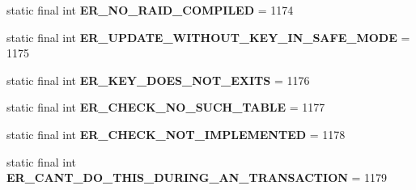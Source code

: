 \begin{DoxyCompactItemize}
\item 
\mbox{\label{classcom_1_1mysql_1_1cj_1_1exceptions_1_1_mysql_error_numbers_a4344df96096a5800d1eb6bc0d83f7972}} 
static final int {\bfseries E\+R\+\_\+\+N\+O\+\_\+\+R\+A\+I\+D\+\_\+\+C\+O\+M\+P\+I\+L\+ED} = 1174
\item 
\mbox{\label{classcom_1_1mysql_1_1cj_1_1exceptions_1_1_mysql_error_numbers_a95c6ce896a03308d2e90ca7d1ec9c8f3}} 
static final int {\bfseries E\+R\+\_\+\+U\+P\+D\+A\+T\+E\+\_\+\+W\+I\+T\+H\+O\+U\+T\+\_\+\+K\+E\+Y\+\_\+\+I\+N\+\_\+\+S\+A\+F\+E\+\_\+\+M\+O\+DE} = 1175
\item 
\mbox{\label{classcom_1_1mysql_1_1cj_1_1exceptions_1_1_mysql_error_numbers_a510271af24977e0a85a10535af2a0aac}} 
static final int {\bfseries E\+R\+\_\+\+K\+E\+Y\+\_\+\+D\+O\+E\+S\+\_\+\+N\+O\+T\+\_\+\+E\+X\+I\+TS} = 1176
\item 
\mbox{\label{classcom_1_1mysql_1_1cj_1_1exceptions_1_1_mysql_error_numbers_a54f60020f9fadfd896f1b27839ac50d0}} 
static final int {\bfseries E\+R\+\_\+\+C\+H\+E\+C\+K\+\_\+\+N\+O\+\_\+\+S\+U\+C\+H\+\_\+\+T\+A\+B\+LE} = 1177
\item 
\mbox{\label{classcom_1_1mysql_1_1cj_1_1exceptions_1_1_mysql_error_numbers_a84ef8033a35212b17dc4a0527a4d089b}} 
static final int {\bfseries E\+R\+\_\+\+C\+H\+E\+C\+K\+\_\+\+N\+O\+T\+\_\+\+I\+M\+P\+L\+E\+M\+E\+N\+T\+ED} = 1178
\item 
\mbox{\label{classcom_1_1mysql_1_1cj_1_1exceptions_1_1_mysql_error_numbers_aa81fb213e659a3c131de7eedb9e58ac5}} 
static final int {\bfseries E\+R\+\_\+\+C\+A\+N\+T\+\_\+\+D\+O\+\_\+\+T\+H\+I\+S\+\_\+\+D\+U\+R\+I\+N\+G\+\_\+\+A\+N\+\_\+\+T\+R\+A\+N\+S\+A\+C\+T\+I\+ON} = 1179
\item 
\mbox{\label{classcom_1_1mysql_1_1cj_1_1exceptions_1_1_mysql_error_numbers_afe33ba67e0629e1b04165bb608821b6c}} 

\end{DoxyCompactItemize}
